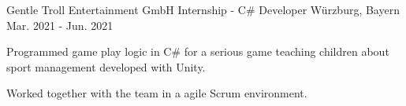\begin{cventries}
  \cventry
    {Gentle Troll Entertainment GmbH} %
    {Internship - C\# Developer} %
    {Würzburg, Bayern} %
    {Mar. 2021 - Jun. 2021} %
    {
      \begin{cvitems} %
        \item {Programmed game play logic in C\# for a serious game teaching children about sport management developed with Unity.}
        \item {Worked together with the team in a agile Scrum environment.}
      \end{cvitems}
    }


\end{cventries}
